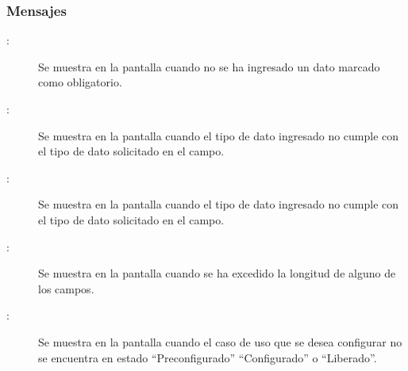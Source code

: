 \subsubsection{Mensajes}

\begin{description}
	\item[:] Se muestra en la pantalla  cuando no se ha ingresado un dato marcado como obligatorio.
	\item[:] Se muestra en la pantalla  cuando el tipo de dato ingresado no cumple con el tipo de dato solicitado en el campo.
	\item[:] Se muestra en la pantalla  cuando el tipo de dato ingresado no cumple con el tipo de dato solicitado en el campo.
	\item [:] Se muestra en la pantalla  cuando se ha excedido la longitud de alguno de los campos.
	\item [:] Se muestra en la pantalla  cuando el caso de uso que se desea configurar no se encuentra en estado ``Preconfigurado'' ``Configurado'' o ``Liberado''.
\end{description}
